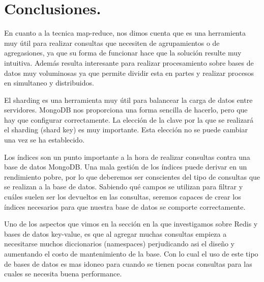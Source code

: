 \section{Conclusiones.}
En cuanto a la tecnica map-reduce, nos dimos cuenta que es una herramienta muy útil para realizar consultas que necesiten de agrupamientos o de agregasiones, ya que su forma de funcionar hace que la solución resulte muy intuitiva. Además resulta interesante para realizar procesamiento sobre bases de datos muy voluminosas ya que permite dividir esta en partes y realizar procesos en simultaneo y distribuidos.

El sharding es una herramienta muy útil para balancear la carga de datos entre servidores. MongoDB nos proporciona una forma sencilla de hacerlo, pero que hay que configurar correctamente. La elección de la clave por la que se realizará el sharding (shard key) es muy importante. Esta elección no se puede cambiar una vez se ha establecido.

Los índices son un punto importante a la hora de realizar consultas contra una base de datos MongoDB. Una mala gestión de los índices puede derivar en un rendimiento pobre, por lo que deberemos ser conscientes del tipo de consultas que se realizan a la base de datos. Sabiendo qué campos se utilizan para filtrar y cuáles suelen ser los devueltos en las consultas, seremos capaces de crear los índices necesarios para que nuestra base de datos se comporte correctamente.

Uno de los aspectos que vimos en la sección en la que investigamos sobre Redis y bases de datos key-value, es que al agregar muchas consultas empieza a necesitarse muchos diccionarios (namespaces) perjudicando asi el diseño y aumentando el costo de mantenimiento de la base. Con lo cual el uso de este tipo de bases de datos es mas idoneo para cuando se tienen pocas consultas para las cuales se necesita buena performance.
